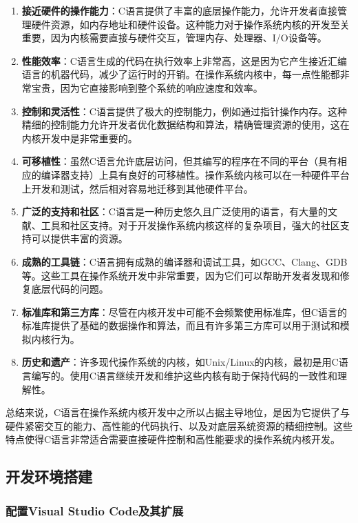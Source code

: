 \begin{enumerate}
    \item \textbf{接近硬件的操作能力}：C语言提供了丰富的底层操作能力，允许开发者直接管理硬件资源，如内存地址和硬件设备。这种能力对于操作系统内核的开发至关重要，因为内核需要直接与硬件交互，管理内存、处理器、I/O设备等。
    \item \textbf{性能效率}：C语言生成的代码在执行效率上非常高，这是因为它产生接近汇编语言的机器代码，减少了运行时的开销。在操作系统内核中，每一点性能都非常宝贵，因为它直接影响到整个系统的响应速度和效率。
    \item \textbf{控制和灵活性}：C语言提供了极大的控制能力，例如通过指针操作内存。这种精细的控制能力允许开发者优化数据结构和算法，精确管理资源的使用，这在内核开发中是非常重要的。
    \item \textbf{可移植性}：虽然C语言允许底层访问，但其编写的程序在不同的平台（具有相应的编译器支持）上具有良好的可移植性。操作系统内核可以在一种硬件平台上开发和测试，然后相对容易地迁移到其他硬件平台。
    \item \textbf{广泛的支持和社区}：C语言是一种历史悠久且广泛使用的语言，有大量的文献、工具和社区支持。对于开发操作系统内核这样的复杂项目，强大的社区支持可以提供丰富的资源。
    \item \textbf{成熟的工具链}：C语言拥有成熟的编译器和调试工具，如GCC、Clang、GDB等。这些工具在操作系统开发中非常重要，因为它们可以帮助开发者发现和修复底层代码的问题。
    \item \textbf{标准库和第三方库}：尽管在内核开发中可能不会频繁使用标准库，但C语言的标准库提供了基础的数据操作和算法，而且有许多第三方库可以用于测试和模拟内核行为。
    \item \textbf{历史和遗产}：许多现代操作系统的内核，如Unix/Linux的内核，最初是用C语言编写的。使用C语言继续开发和维护这些内核有助于保持代码的一致性和理解性。
\end{enumerate}

总结来说，C语言在操作系统内核开发中之所以占据主导地位，是因为它提供了与硬件紧密交互的能力、高性能的代码执行、以及对底层系统资源的精细控制。这些特点使得C语言非常适合需要直接硬件控制和高性能要求的操作系统内核开发。

\subsection{开发环境搭建}

\subsubsection{配置Visual Studio Code及其扩展}

